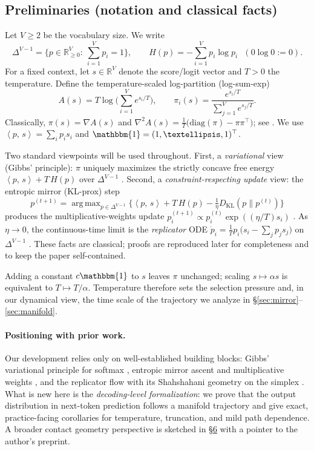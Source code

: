 \documentclass[10pt,a4paper]{amsart}
\numberwithin{equation}{section}
\theoremstyle{plain}
\theoremstyle{definition}
\theoremstyle{remark}
\DeclareMathOperator*{\argmax}{arg\,max}
\newcommand{\R}{\mathbb{R}}
\newcommand{\1}{\mathbbm{1}}
\newcommand{\ip}[2]{\left\langle #1,\, #2 \right\rangle}
\newcommand{\simplex}{\Delta^{V-1}}
\begin{document}
\subsection{Preliminaries (notation and classical facts)}\label{subsec:preliminaries}
Let $V\ge 2$ be the vocabulary size. We write
\[
\simplex=\Big\{p\in\R^V_{\ge 0}:\ \sum_{i=1}^V p_i=1\Big\},\qquad
H(p)=-\sum_{i=1}^V p_i\log p_i\ \ \ (0\log 0:=0).
\]
For a fixed context, let $s\in\R^V$ denote the score/logit vector and $T>0$ the temperature.
Define the temperature-scaled log-partition (log-sum-exp)
\[
A(s)=T\log\!\Big(\sum_{i=1}^V e^{s_i/T}\Big),\qquad
\pi_i(s)=\frac{e^{s_i/T}}{\sum_{j=1}^V e^{s_j/T}}.
\]
Classically, $\pi(s)=\nabla A(s)$ and
$\nabla^2 A(s)=\tfrac{1}{T}\big(\mathrm{diag}(\pi)-\pi\pi^\top\big)$; see
\citet{jaynes1957information,cover2006elements,wainwright2008graphical,murphy2012ml}.
We use $\ip{p}{s}=\sum_i p_i s_i$ and $\1=(1,\dots,1)^\top$.

Two standard viewpoints will be used throughout. First, a \emph{variational} view
(Gibbs’ principle): $\pi$ uniquely maximizes the strictly concave free energy
$\ip{p}{s}+T\,H(p)$ over $\simplex$ \citep{jaynes1957information,cover2006elements,boyd2004convex}.
Second, a \emph{constraint-respecting update} view: the entropic mirror (KL-prox) step
\[
p^{(t+1)}=\argmax_{p\in\simplex}\Big\{\ip{p}{s}+T\,H(p)-\tfrac{1}{\eta}D_{\mathrm{KL}}(p\|p^{(t)})\Big\}
\]
produces the multiplicative-weights update
$p^{(t+1)}_i \propto p^{(t)}_i \exp((\eta/T)s_i)$
\citep{beck2003mirror,arora2012multiplicative,raginsky2012mirror}. As $\eta\to 0$, the
continuous-time limit is the \emph{replicator} ODE
$\dot p_i=\tfrac{1}{T}p_i\big(s_i-\sum_j p_j s_j\big)$ on $\simplex$
\citep{shahshahani1979nouvelle,hofbauer1998evolutionary}. These facts are classical; proofs are
reproduced later for completeness and to keep the paper self-contained.


Adding a constant $c\1$ to $s$ leaves $\pi$ unchanged; scaling $s\mapsto \alpha s$ is equivalent to
$T\mapsto T/\alpha$. Temperature therefore sets the selection pressure and, in our dynamical view,
the time scale of the trajectory we analyze in \S\ref{sec:mirror}–\ref{sec:manifold}.

\paragraph{Positioning with prior work.}
Our development relies only on well-established building blocks: Gibbs’ variational principle for
softmax \citep{jaynes1957information,cover2006elements}, entropic mirror ascent and multiplicative
weights \citep{beck2003mirror,arora2012multiplicative,raginsky2012mirror}, and the replicator flow
with its Shahshahani geometry on the simplex \citep{shahshahani1979nouvelle,hofbauer1998evolutionary}.
What is new here is the \emph{decoding-level formalization}: we prove that the output distribution in
next-token prediction follows a manifold trajectory and give exact, practice-facing corollaries for
temperature, truncation, and mild path dependence. A broader contact geometry perspective is sketched
in \S\href{https://arxiv.org/abs/2508.21186v1}{6} with a pointer to the author’s preprint.
\end{document}
